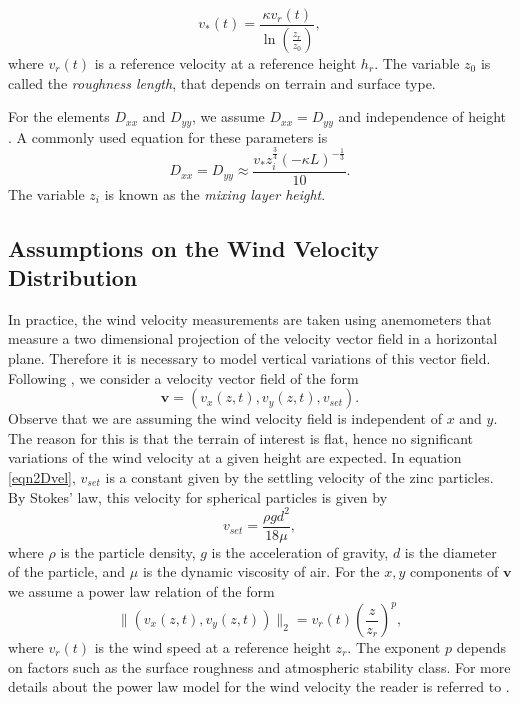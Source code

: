 \documentclass{sfuthesis}
\newcommand{\vv}{\textbf{v}}
\begin{document}
\begin{equation*}
v_{*}(t)=\frac{\kappa v_{r}(t)}{\ln(\frac{z_{r}}{z_{0}})},
\end{equation*}
where $v_{r}(t)$ is a reference velocity at a reference height $h_{r}$. The variable $z_{0}$ 
is called the \textit{roughness length}, that depends on terrain and surface type.

For the elements $D_{xx}$ and $D_{yy}$, we assume $D_{xx}=D_{yy}$ and independence of height 
\cite{monin1954basic}. A commonly used equation for these parameters
 is
\begin{equation*}
D_{xx}=D_{yy}\approx \frac{v_{*}z_{i}^{\frac{3}{4}}(-\kappa L)^{-\frac{1}{3}}}{10}.
\end{equation*}
The variable $z_{i}$ is known as the \textit{mixing layer height}.

\subsection{Assumptions on the Wind Velocity Distribution}
In practice, the wind velocity measurements are taken using anemometers that  
measure a two dimensional projection of the   velocity vector field in a horizontal plane.
Therefore
it is necessary to model vertical variations of this vector field.
Following \cite{hosseini2016airborne}, we consider a velocity vector field of the form 
\begin{equation}\label{eqn2Dvel}
\vv=(v_{x}(z,t),v_{y}(z,t),v_{set}).
\end{equation}
Observe that we are assuming  the wind velocity field is independent of $x$ and $y$. The reason for this is
that the terrain of interest is flat, hence no significant variations of the wind velocity at a given height are 
expected.
In equation \eqref{eqn2Dvel}, $v_{set}$ is a constant given by  the settling velocity of the zinc particles. By Stokes' law,
this velocity for spherical particles is given by
\begin{equation*}
v_{set}=\frac{\rho g d^{2}}{18\mu},
\end{equation*}
where $\rho$ is the particle density, $g$ is the acceleration of gravity,  $d$ is the diameter of the particle, and
$\mu$ is the dynamic viscosity of air. For the $x,y$ components of $\vv$ we assume a power law relation of the form
\begin{equation}\label{eqnPowerLaw}
\|(v_{x}(z,t),v_{y}(z,t))\|_{2}=v_{r}(t)\left(\frac{z}{z_{r}}\right)^{p},
\end{equation}
where $v_{r}(t)$  is the wind speed at a reference height $z_{r}$. The exponent $p$ depends on 
factors such as the surface roughness and atmospheric stability class. For more details about the power
law model for the wind velocity the reader is referred to \cite{seinfeld1998atmospheric}.
\end{document}
